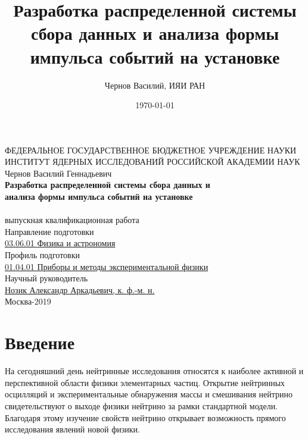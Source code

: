 \documentclass[a4paper,14pt]{extreport}
\title{Разработка распределенной системы сбора данных и анализа формы импульса событий на установке \textquote{Троицк ню-масс}}
\author{Чернов Василий, ИЯИ РАН}
\date{\today}
\begin{document}
\thispagestyle{empty}
\begin{center}
\hfill \break
\normalsize{ФЕДЕРАЛЬНОЕ  ГОСУДАРСТВЕННОЕ БЮДЖЕТНОЕ УЧРЕЖДЕНИЕ НАУКИ}\\
\normalsize{ИНСТИТУТ ЯДЕРНЫХ ИССЛЕДОВАНИЙ РОССИЙСКОЙ АКАДЕМИИ НАУК} \\
\hfill \break
\hfill \break
\hfill \break
\normalsize{Чернов Василий Геннадьевич}\\
\hfill \break
\hfill \break
\normalsize{
    \textbf{Разработка распределенной системы сбора данных и \\анализа формы импульса событий на установке \\ } \\
    }
\hfill \break
\normalsize{выпускная квалификационная работа} \\
\hfill \break
\hfill \break
Направление подготовки \\
\underline{03.06.01 Физика и астрономия} \\
\hfill \break
\hfill \break
Профиль подготовки \\
\underline{01.04.01 Приборы и методы экспериментальной физики} \\
\hfill \break
\hfill \break
Научный руководитель\\
\underline{Нозик Александр Аркадьевич, к. ф.-м. н.} \\
\hfill \break
\hfill \break
\hfill \break
\hfill \break
\hfill \break
\normalsize{ Москва-2019 }\\
\end{center}

\newpage

\setcounter{tocdepth}{3}
\tableofcontents
\newpage
\listoftodos


\chapter*{Введение}

На сегодняшний день нейтринные исследования относятся к наиболее активной и перспективной области физики элементарных частиц. Открытие нейтринных осцилляций и экспериментальные обнаружения массы и смешивания нейтрино\cite{SuperKamiokande}\cite{SNO} свидетельствуют о выходе физики нейтрино за рамки стандартной модели. Благодаря этому изучение свойств нейтрино открывает возможность прямого исследования явлений новой физики.
\end{document}
